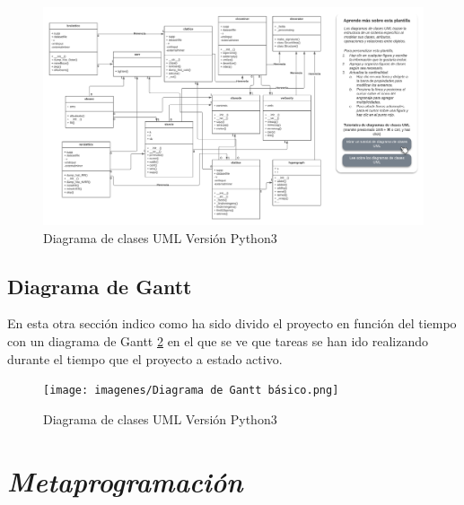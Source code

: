 \documentclass{cosas/tfg_domingo}
\begin{document}
\newpage

\begin{figure}[ht!] %
\begin{center}
\includegraphics[width=1.5\linewidth]{imagenes/python3 - Clase UML.png}
\end{center}
\caption{Diagrama de clases UML Versión Python3}
\label{fig_UML3}
\end{figure}

\newpage

\section{Diagrama de Gantt}

En esta otra sección indico como ha sido divido el proyecto en función del tiempo con un diagrama de Gantt \ref{fig_GANTT} en el que se ve que tareas se han ido realizando durante el tiempo que el proyecto a estado activo.

\begin{figure}[ht!] %
\begin{center}
\texttt{[image: imagenes/Diagrama de Gantt básico.png]}
\end{center}
\caption{Diagrama de clases UML Versión Python3}
\label{fig_GANTT}
\end{figure}



\chapter{\emph{Metaprogramación}}
\end{document}
